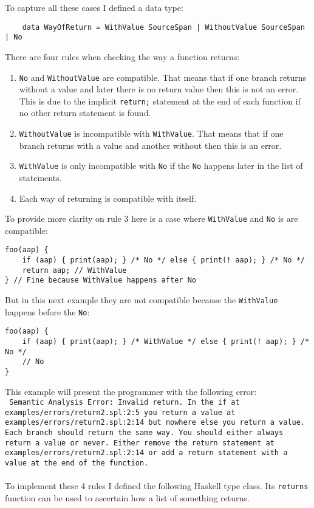 \documentclass{report}
\begin{document}
\noindent To capture all these cases I defined a data type:

\begin{verbatim}
    data WayOfReturn = WithValue SourceSpan | WithoutValue SourceSpan | No 
\end{verbatim}

\noindent There are four rules when checking the way a function returns: \begin{enumerate}
    \item \texttt{No} and \texttt{WithoutValue} are compatible. That means that if one branch returns without a value and later there is no return value then this is not an error. This is due to the implicit \texttt{return;} statement at the end of each function if no other return statement is found. 
    \item \texttt{WithoutValue} is incompatible with \texttt{WithValue}. That means that if one branch returns with a value and another without then this is an error. 
    \item \texttt{WithValue} is only incompatible with \texttt{No} if the \texttt{No} happens later in the list of statements. 
    \item Each way of returning is compatible with itself. 
\end{enumerate} 

\noindent To provide more clarity on rule 3 here is a case where \texttt{WithValue} and \texttt{No} is are compatible:

\begin{lstlisting}[style=spl]
foo(aap) {
    if (aap) { print(aap); } /* No */ else { print(! aap); } /* No */
    return aap; // WithValue 
} // Fine because WithValue happens after No
\end{lstlisting}

But in this next example they are not compatible because the \texttt{WithValue} happens before the \texttt{No}:

\begin{lstlisting}[style=spl]
foo(aap) {
    if (aap) { print(aap); } /* WithValue */ else { print(! aap); } /* No */
    // No
} 
\end{lstlisting}
\noindent This example will present the programmer with the following error:
\\
\texttt{
\textcolor{error}{Semantic Analysis Error: Invalid return.} In the if at \textcolor{filename}{examples/errors/return2.spl:2:5} you return a value at \textcolor{filename}{examples/errors/return2.spl:2:14} but nowhere else you return a value. \\
Each branch should return the same way. You should either always return a value or never.
Either remove the return statement at \textcolor{filename}{examples/errors/return2.spl:2:14} or add a return statement with a value at the end of the function.
}
\\\\
\noindent To implement these 4 rules I defined the following Haskell type class. Its \texttt{returns} function can be used to ascertain how a list of something returns. 
\end{document}
